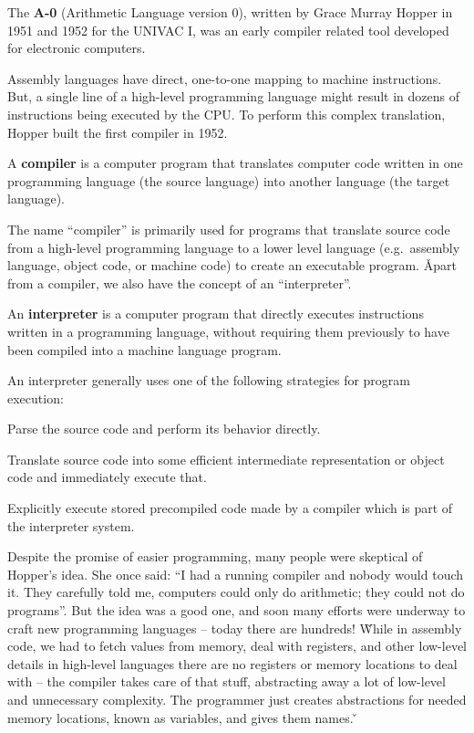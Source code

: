 \bd[A-0]
The \textbf{A-0} (Arithmetic Language version 0), written by Grace Murray Hopper in 1951 and 1952 for the UNIVAC I,
was an early compiler related tool developed for electronic computers.
\ed

Assembly languages have direct, one-to-one mapping to machine instructions. But, a single line of a high-level
programming language might result in dozens of instructions being executed by the CPU. To perform this complex
translation, Hopper built the first compiler in 1952.

\bd[Compiler]
A \textbf{compiler} is a computer program that translates computer code written in one programming language (the
source language) into another language (the target language).
\ed

The name ``compiler'' is primarily used for programs that translate source code from a high-level programming
language to a lower level language (e.g.\ assembly language, object code, or machine code) to create an executable
program. \v

Apart from a compiler, we also have the concept of an ``interpreter''.

\bd[Interpreter]
An \textbf{interpreter} is a computer program that directly executes instructions written in a programming language,
without requiring them previously to have been compiled into a machine language program.
\ed

An interpreter generally uses one of the following strategies for program execution:
\bit
\item Parse the source code and perform its behavior directly.
\item Translate source code into some efficient intermediate representation or object code and immediately execute that.
\item Explicitly execute stored precompiled code made by a compiler which is part of the interpreter system.
\eit

Despite the promise of easier programming, many people were skeptical of Hopper's idea. She once said: ``I had a
running compiler and nobody would touch it. They carefully told me, computers could only do arithmetic; they could
not do programs''. But the idea was a good one, and soon many efforts were underway to craft new programming
languages -- today there are hundreds! \v

While in assembly code, we had to fetch values from memory, deal with registers, and other low-level details in
high-level languages there are no registers or memory locations to deal with -- the compiler takes care of that
stuff, abstracting away a lot of low-level and unnecessary complexity. The programmer just creates abstractions for
needed memory locations,  known as variables, and gives them names. \v

